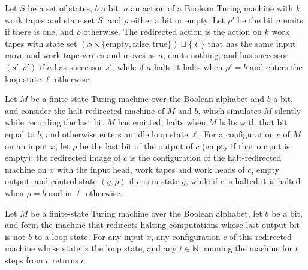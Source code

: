 \begin{definition}
\label{Turing.FinTM.redirectAction}
\leanok
{}
Let $S$ be a set of states, $b$ a bit, $a$ an action of a Boolean Turing machine with $k$
work tapes and state set $S$, and $\rho$ either a bit or empty. Let $\rho'$ be the bit
$a$ emits if there is one, and $\rho$ otherwise. The redirected action is the action on
$k$ work tapes with state set $(S \times \{\text{empty}, \mathrm{false},
\mathrm{true}\}) \sqcup \{\ell\}$ that has the same input move and work-tape writes and
moves as $a$, emits nothing, and has successor $(s', \rho')$ if $a$ has successor $s'$,
while if $a$ halts it halts when $\rho' = b$ and enters the loop state $\ell$ otherwise.
\end{definition}

\begin{definition}
\label{Turing.FinTM.redirectCfg}
\leanok
{}
Let $M$ be a finite-state Turing machine over the Boolean alphabet and $b$ a bit, and
consider the halt-redirected machine of $M$ and $b$, which simulates $M$ silently while
recording the last bit $M$ has emitted, halts when $M$ halts with that bit equal to $b$,
and otherwise enters an idle loop state $\ell$. For a configuration $c$ of $M$ on an input
$x$, let $\rho$ be the last bit of the output of $c$ (empty if that output is empty); the
redirected image of $c$ is the configuration of the halt-redirected machine on $x$ with
the input head, work tapes and work heads of $c$, empty output, and control state
$(q, \rho)$ if $c$ is in state $q$, while if $c$ is halted it is halted when $\rho = b$
and in $\ell$ otherwise.
\end{definition}

\begin{lemma}
\label{Turing.FinTM.redirect_loop}
\leanok
{}
Let $M$ be a finite-state Turing machine over the Boolean alphabet, let $b$ be a bit,
and form the machine that redirects halting computations whose last output bit is not
$b$ to a loop state. For any input $x$, any configuration $c$ of this redirected machine
whose state is the loop state, and any $t \in \mathbb{N}$, running the machine for $t$
steps from $c$ returns $c$.
\end{lemma}

